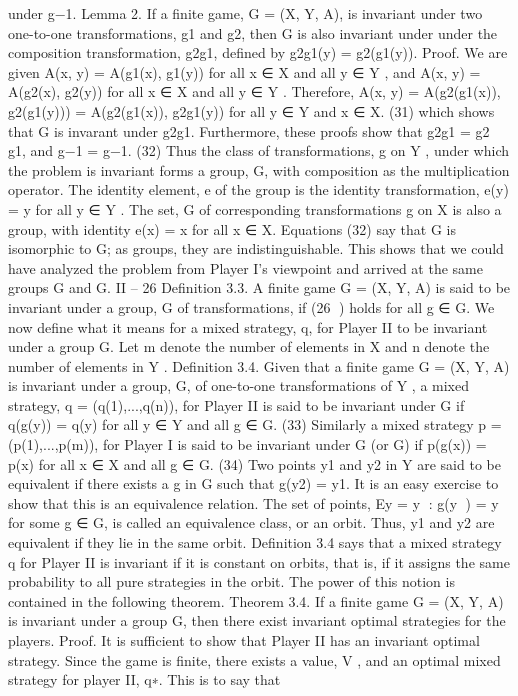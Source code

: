under g−1.
Lemma 2. If a finite game, G = (X, Y, A), is invariant under two one-to-one transformations,
g1 and g2, then G is also invariant under under the composition transformation,
g2g1, defined by g2g1(y) = g2(g1(y)).
Proof. We are given A(x, y) = A(g1(x), g1(y)) for all x ∈ X and all y ∈ Y , and A(x, y) =
A(g2(x), g2(y)) for all x ∈ X and all y ∈ Y . Therefore,
A(x, y) = A(g2(g1(x)), g2(g1(y))) = A(g2(g1(x)), g2g1(y)) for all y ∈ Y and x ∈ X.
(31)
which shows that G is invarant under g2g1.
Furthermore, these proofs show that
g2g1 = g2 g1, and g−1 = g−1. (32)
Thus the class of transformations, g on Y , under which the problem is invariant forms a
group, G, with composition as the multiplication operator. The identity element, e of the
group is the identity transformation, e(y) = y for all y ∈ Y . The set, G of corresponding
transformations g on X is also a group, with identity e(x) = x for all x ∈ X. Equations
(32) say that G is isomorphic to G; as groups, they are indistinguishable.
This shows that we could have analyzed the problem from Player I’s viewpoint and
arrived at the same groups G and G.
II – 26
Definition 3.3. A finite game G = (X, Y, A) is said to be invariant under a group, G of
transformations, if (26
) holds for all g ∈ G.
We now define what it means for a mixed strategy, q, for Player II to be invariant
under a group G. Let m denote the number of elements in X and n denote the number of
elements in Y .
Definition 3.4. Given that a finite game G = (X, Y, A) is invariant under a group, G,
of one-to-one transformations of Y , a mixed strategy, q = (q(1),...,q(n)), for Player II is
said to be invariant under G if
q(g(y)) = q(y) for all y ∈ Y and all g ∈ G. (33)
Similarly a mixed strategy p = (p(1),...,p(m)), for Player I is said to be invariant under
G (or G) if
p(g(x)) = p(x) for all x ∈ X and all g ∈ G. (34)
Two points y1 and y2 in Y are said to be equivalent if there exists a g in G such that
g(y2) = y1. It is an easy exercise to show that this is an equivalence relation. The set of
points, Ey = {y : g(y
) = y for some g ∈ G}, is called an equivalence class, or an orbit.
Thus, y1 and y2 are equivalent if they lie in the same orbit. Definition 3.4 says that a mixed
strategy q for Player II is invariant if it is constant on orbits, that is, if it assigns the same
probability to all pure strategies in the orbit. The power of this notion is contained in the
following theorem.
Theorem 3.4. If a finite game G = (X, Y, A) is invariant under a group G, then there
exist invariant optimal strategies for the players.
Proof. It is sufficient to show that Player II has an invariant optimal strategy. Since the
game is finite, there exists a value, V , and an optimal mixed strategy for player II, q∗.
This is to say that


